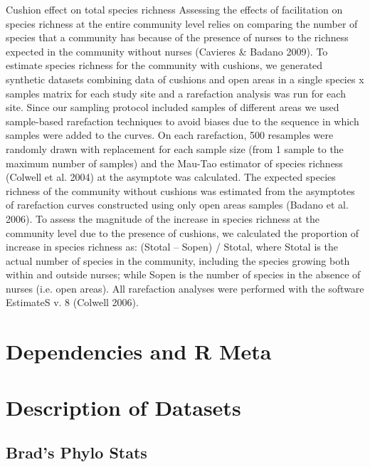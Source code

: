 \documentclass[12pt]{article}
\begin{document}
Cushion effect on total species richness
Assessing the effects of facilitation on species richness at the
entire community level relies on comparing the number of species that
a community has because of the presence of nurses to the richness
expected in the community without nurses (Cavieres & Badano 2009). To
estimate species richness for the community with cushions, we
generated synthetic datasets combining data of cushions and open areas
in a single species x samples matrix for each study site and a
rarefaction analysis was run for each site. Since our sampling
protocol included samples of different areas we used sample-based
rarefaction techniques to avoid biases due to the sequence in which
samples were added to the curves. On each rarefaction, 500 resamples
were randomly drawn with replacement for each sample size (from 1
sample to the maximum number of samples) and the Mau-Tao estimator of
species richness (Colwell et al. 2004) at the asymptote was
calculated. The expected species richness of the community without
cushions was estimated from the asymptotes of rarefaction curves
constructed using only open areas samples (Badano et al. 2006). To
assess the magnitude of the increase in species richness at the
community level due to the presence of cushions, we calculated the
proportion of increase in species richness as: (Stotal – Sopen) /
Stotal, where Stotal is the actual number of species in the community,
including the species growing both within and outside nurses; while
Sopen is the number of species in the absence of nurses (i.e. open
areas). All rarefaction analyses were performed with the software
EstimateS v. 8 (Colwell 2006).



\section{Dependencies and R Meta}



\section{Description of Datasets}

\subsection{Brad's Phylo Stats}
\end{document}
